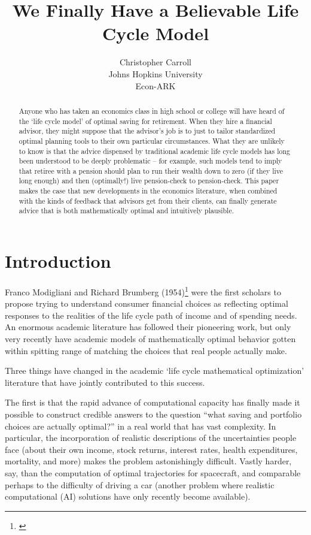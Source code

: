 \documentclass{article}
\title{We Finally Have a Believable Life Cycle Model}
\date{\displaydate{articleDate}}
\author{Christopher Carroll\footnotemark[1]\\
Johns Hopkins University\\Econ-ARK\\}
\begin{document}
\maketitle
{}

\begin{abstract}
Anyone who has taken an economics class in high school or college will have heard of the `life cycle model' of optimal saving for retirement. When they hire a financial advisor, they might suppose that the advisor's job is to just to tailor standardized optimal planning tools to their own particular circumstances. What they are unlikely to know is that the advice dispensed by traditional academic life cycle models has long been understood to be deeply problematic -- for example, such models tend to imply that retiree with a pension should plan to run their wealth down to zero (if they live long enough) and then (optimally!) live pension-check to pension-check. This paper makes the case that new developments in the economics literature, when combined with the kinds of feedback that advisors get from their clients, can finally generate advice that is both mathematically optimal and intuitively plausible.
\end{abstract}

\keywords{}

\section{Introduction}

Franco Modigliani and Richard Brumberg (1954)\footnote{\cite{2005}} were the first scholars to propose trying to understand consumer financial choices as reflecting optimal responses to the realities of the life cycle path of income and of spending needs. An enormous academic literature has followed their pioneering work, but only very recently have academic models of mathematically optimal behavior gotten within spitting range of matching the choices that real people actually make.

Three things have changed in the academic `life cycle mathematical optimization' literature that have jointly contributed to this success.

The first is that the rapid advance of computational capacity has finally made it possible to construct credible answers to the question ``what saving and portfolio choices are actually optimal?'' in a real world that has vast complexity. In particular, the incorporation of realistic descriptions of the uncertainties people face (about their own income, stock returns, interest rates, health expenditures, mortality, and more) makes the problem astonishingly difficult. Vastly harder, say, than the computation of optimal trajectories for spacecraft, and comparable perhaps to the difficulty of driving a car (another problem where realistic computational (AI) solutions have only recently become available).
\end{document}
